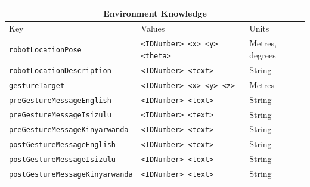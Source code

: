 \documentclass{CSSRforAfrica}
\begin{document}
\begin{table}[H]
\begin{center}
\begin{tabular}{|l l l|}
\hline \hline
\multicolumn{3}{|c|}{{\small \bf Environment Knowledge}} \\
\hline \hline
 {\small Key  }                                                                          &  {\small Values }     &                               {\small Units }       \\
\hline
{\footnotesize \verb+robotLocationPose+} 	                          & {\footnotesize \verb+<IDNumber> <x> <y> <theta>+ } \vspace{0mm} & {\footnotesize Metres, degrees } \\
{\footnotesize \verb+robotLocationDescription+} 	                  & {\footnotesize \verb+<IDNumber> <text>+} \vspace{0mm} & {\footnotesize  String} \\
{\footnotesize \verb+gestureTarget+} 	                                  & {\footnotesize \verb+<IDNumber> <x> <y> <z>+} \vspace{0mm} & {\footnotesize  Metres} \\
{\footnotesize \verb+preGestureMessageEnglish+} 	           & {\footnotesize \verb+<IDNumber> <text>+} \vspace{0mm} & {\footnotesize  String } \\
{\footnotesize \verb+preGestureMessageIsizulu+} 	           & {\footnotesize \verb+<IDNumber> <text>+} \vspace{0mm} & {\footnotesize  String } \\
{\footnotesize \verb+preGestureMessageKinyarwanda+}         & {\footnotesize \verb+<IDNumber> <text>+} \vspace{0mm} & {\footnotesize  String } \\
{\footnotesize \verb+postGestureMessageEnglish+} 	           & {\footnotesize \verb+<IDNumber> <text>+} \vspace{0mm} & {\footnotesize  String} \\
{\footnotesize \verb+postGestureMessageIsizulu+} 	           & {\footnotesize \verb+<IDNumber> <text>+} \vspace{0mm} & {\footnotesize  String} \\
{\footnotesize \verb+postGestureMessageKinyarwanda+} 	   & {\footnotesize \verb+<IDNumber> <text>+} \vspace{0mm} & {\footnotesize  String} \\

\end{tabular}
\end{center}
\end{table}
\end{document}
